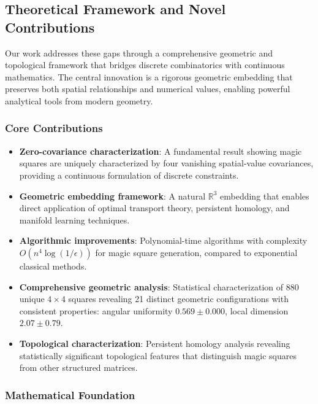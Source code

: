 \subsection{Theoretical Framework and Novel Contributions}

Our work addresses these gaps through a comprehensive geometric and topological framework that bridges discrete combinatorics with continuous mathematics. The central innovation is a rigorous geometric embedding that preserves both spatial relationships and numerical values, enabling powerful analytical tools from modern geometry.

\subsubsection{Core Contributions}

\begin{itemize}
    \item \textbf{Zero-covariance characterization}: A fundamental result showing magic squares are uniquely characterized by four vanishing spatial-value covariances, providing a continuous formulation of discrete constraints.
    
    \item \textbf{Geometric embedding framework}: A natural $\mathbb{R}^3$ embedding that enables direct application of optimal transport theory, persistent homology, and manifold learning techniques.
    
    \item \textbf{Algorithmic improvements}: Polynomial-time algorithms with complexity $O(n^4 \log(1/\epsilon))$ for magic square generation, compared to exponential classical methods.
    
    \item \textbf{Comprehensive geometric analysis}: Statistical characterization of 880 unique $4 \times 4$ squares revealing 21 distinct geometric configurations with consistent properties: angular uniformity $0.569 \pm 0.000$, local dimension $2.07 \pm 0.79$.
    
    \item \textbf{Topological characterization}: Persistent homology analysis revealing statistically significant topological features that distinguish magic squares from other structured matrices.
\end{itemize}

\subsubsection{Mathematical Foundation}

